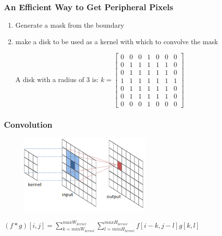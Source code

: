 \documentclass{beamer} %
\begin{document}
\begin{frame}
	\frametitle{An Efficient Way to Get Peripheral Pixels}
	\begin{enumerate}
			\item Generate a mask from the boundary
			\item make a disk to be used as a kernel with which to convolve the mask
			\begin{Example}
				A disk with a radius of 3 is:
				\newline
				$k = \begin{bmatrix}
					0 & 0 & 0 & 1 & 0 & 0 & 0 \\
					0 & 1 & 1 & 1 & 1 & 1 & 0 \\
					0 & 1 & 1 & 1 & 1 & 1 & 0 \\
					1 & 1 & 1 & 1 & 1 & 1 & 1 \\
					0 & 1 & 1 & 1 & 1 & 1 & 0 \\
					0 & 1 & 1 & 1 & 1 & 1 & 0 \\
					0 & 0 & 0 & 1 & 0 & 0 & 0
				\end{bmatrix}$
			\end{Example}
	\end{enumerate}
\end{frame}

\begin{frame}
	
		\frametitle{Convolution}
\begin{description}
	\item	
	\begin{figure}	
		\centering
		\includegraphics[height=4cm]{RiverTrain-ImageConvDiagram}  \hspace*{4cm}
	\end{figure}
	\item $ (f*g)[i, j] = \sum_{k=minW_{kernel}}^{maxW_{kernel}}\sum_{l=minH_{kernel}}^{maxH_{kernel}} f[i-k, j-l]g[k, l] $
\end{description}
\end{frame}
\end{document}
